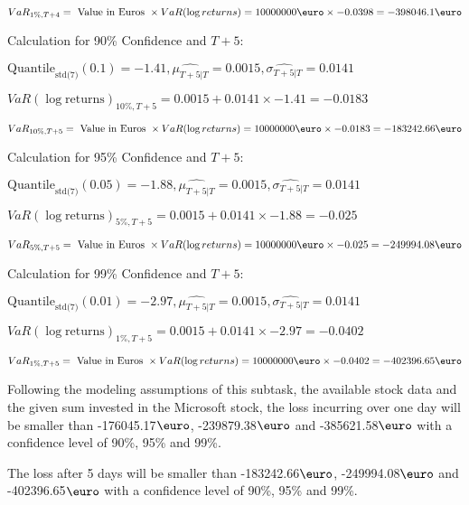 \indent\indent $VaR_{1\%, T + 4} = \text{ Value in Euros } \times VaR(\log returns) = 10 000 000 \text{\euro} \times-0.0398 = -398046.1 \text{\euro}$\newline




Calculation for 90\% Confidence and $T+5$:

\indent\indent $\text{Quantile}_\text{std(7)}(0.1) = -1.41,\hat{\mu_{T+5|T}} = 0.0015, \hat{\sigma_{T+5|T}} = 0.0141$

\indent\indent $VaR(\log \text{returns})_{10\%, T + 5} = 0.0015 + 0.0141\times-1.41 = -0.0183$

\indent\indent $VaR_{10\%, T + 5} = \text{ Value in Euros } \times VaR(\log returns) = 10 000 000 \text{\euro} \times-0.0183 = -183242.66 \text{\euro}$\newline




Calculation for 95\% Confidence and $T+5$:

\indent\indent $\text{Quantile}_\text{std(7)}(0.05) = -1.88,\hat{\mu_{T+5|T}} = 0.0015, \hat{\sigma_{T+5|T}} = 0.0141$

\indent\indent $VaR(\log \text{returns})_{5\%, T + 5} = 0.0015 + 0.0141\times-1.88 = -0.025$

\indent\indent $VaR_{5\%, T + 5} = \text{ Value in Euros } \times VaR(\log returns) = 10 000 000 \text{\euro} \times-0.025 = -249994.08 \text{\euro}$\newline




Calculation for 99\% Confidence and $T+5$:

\indent\indent $\text{Quantile}_\text{std(7)}(0.01) = -2.97,\hat{\mu_{T+5|T}} = 0.0015, \hat{\sigma_{T+5|T}} = 0.0141$

\indent\indent $VaR(\log \text{returns})_{1\%, T + 5} = 0.0015 + 0.0141\times-2.97 = -0.0402$

\indent\indent $VaR_{1\%, T + 5} = \text{ Value in Euros } \times VaR(\log returns) = 10 000 000 \text{\euro} \times-0.0402 = -402396.65 \text{\euro}$\newline


Following the modeling assumptions of this subtask, the available stock data and the given sum invested in the Microsoft stock, the loss incurring over one day will be smaller than -176045.17$\text{\euro}$, -239879.38$\text{\euro}$  and -385621.58$\text{\euro}$  with a confidence level of 90\%, 95\%  and 99\%.

The loss after 5 days will be smaller than -183242.66$\text{\euro}$, -249994.08$\text{\euro}$  and -402396.65$\text{\euro}$  with a confidence level of 90\%, 95\%  and 99\%.

